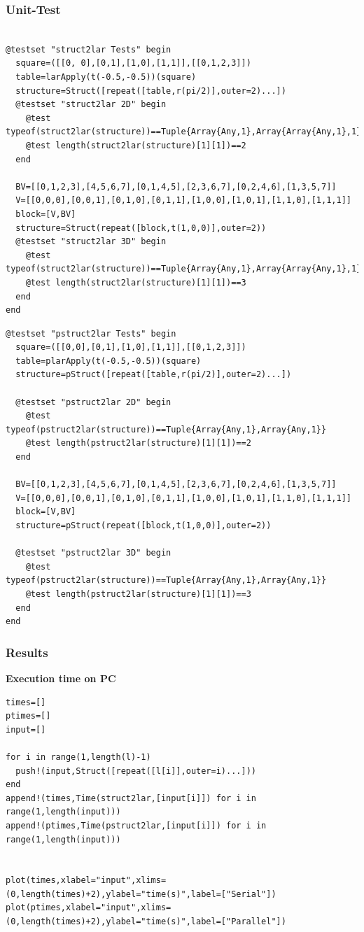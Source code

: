 \documentclass[a4paper,12pt]{article}
\begin{document}
\subsubsection{Unit-Test}
\begin{Verbatim}[fontsize=\footnotesize]

@testset "struct2lar Tests" begin
  square=([[0, 0],[0,1],[1,0],[1,1]],[[0,1,2,3]])
  table=larApply(t(-0.5,-0.5))(square)
  structure=Struct([repeat([table,r(pi/2)],outer=2)...])
  @testset "struct2lar 2D" begin
    @test typeof(struct2lar(structure))==Tuple{Array{Any,1},Array{Array{Any,1},1}}
    @test length(struct2lar(structure)[1][1])==2
  end
  
  BV=[[0,1,2,3],[4,5,6,7],[0,1,4,5],[2,3,6,7],[0,2,4,6],[1,3,5,7]]
  V=[[0,0,0],[0,0,1],[0,1,0],[0,1,1],[1,0,0],[1,0,1],[1,1,0],[1,1,1]]
  block=[V,BV]
  structure=Struct(repeat([block,t(1,0,0)],outer=2))
  @testset "struct2lar 3D" begin
    @test typeof(struct2lar(structure))==Tuple{Array{Any,1},Array{Array{Any,1},1}}
    @test length(struct2lar(structure)[1][1])==3
  end
end

\end{Verbatim}

\noindent{}
\begin{Verbatim}[fontsize=\footnotesize]
@testset "pstruct2lar Tests" begin
  square=([[0,0],[0,1],[1,0],[1,1]],[[0,1,2,3]])
  table=plarApply(t(-0.5,-0.5))(square)
  structure=pStruct([repeat([table,r(pi/2)],outer=2)...])
  
  @testset "pstruct2lar 2D" begin
    @test typeof(pstruct2lar(structure))==Tuple{Array{Any,1},Array{Any,1}}
    @test length(pstruct2lar(structure)[1][1])==2
  end
    
  BV=[[0,1,2,3],[4,5,6,7],[0,1,4,5],[2,3,6,7],[0,2,4,6],[1,3,5,7]]
  V=[[0,0,0],[0,0,1],[0,1,0],[0,1,1],[1,0,0],[1,0,1],[1,1,0],[1,1,1]]
  block=[V,BV]
  structure=pStruct(repeat([block,t(1,0,0)],outer=2))
  
  @testset "pstruct2lar 3D" begin
    @test typeof(pstruct2lar(structure))==Tuple{Array{Any,1},Array{Any,1}}
    @test length(pstruct2lar(structure)[1][1])==3
  end
end
\end{Verbatim}

\subsubsection{Results}
\textbf{Execution time on PC}
\begin{Verbatim}[fontsize=\footnotesize]
times=[]
ptimes=[]
input=[]

for i in range(1,length(l)-1)
  push!(input,Struct([repeat([l[i]],outer=i)...]))
end
append!(times,Time(struct2lar,[input[i]]) for i in range(1,length(input)))
append!(ptimes,Time(pstruct2lar,[input[i]]) for i in range(1,length(input)))


plot(times,xlabel="input",xlims=(0,length(times)+2),ylabel="time(s)",label=["Serial"])
plot(ptimes,xlabel="input",xlims=(0,length(times)+2),ylabel="time(s)",label=["Parallel"])

\end{Verbatim}
\end{document}
